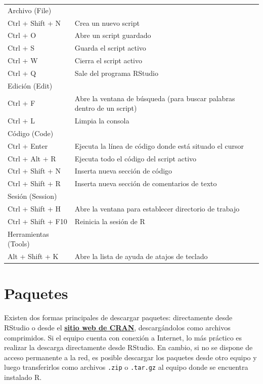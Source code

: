 \documentclass[
  spanish,
  letterpaper,
  DIV=11,
  numbers=noendperiod]{scrreprt}
\begin{document}
\begin{table}
\centering
\begin{tabular}[t]{l|l}
\hline
\cellcolor[HTML]{2f2e4e}{\textcolor{white}{Menú}} & \cellcolor[HTML]{2f2e4e}{\textcolor{white}{Descripción}}\\
\hline
Archivo (File) & \\
\hline
Ctrl + Shift + N & Crea un nuevo script\\
\hline
Ctrl + O & Abre un script guardado\\
\hline
Ctrl + S & Guarda el script activo\\
\hline
Ctrl + W & Cierra el script activo\\
\hline
Ctrl + Q & Sale del programa RStudio\\
\hline
Edición (Edit) & \\
\hline
Ctrl + F & Abre la ventana de búsqueda (para buscar palabras dentro de un script)\\
\hline
Ctrl + L & Limpia la consola\\
\hline
Código (Code) & \\
\hline
Ctrl + Enter & Ejecuta la línea de código donde está situado el cursor\\
\hline
Ctrl + Alt + R & Ejecuta todo el código del script activo\\
\hline
Ctrl + Shift + N & Inserta nueva sección de código\\
\hline
Ctrl + Shift + R & Inserta nueva sección de comentarios de texto\\
\hline
Sesión (Session) & \\
\hline
Ctrl + Shift + H & Abre la ventana para establecer directorio de trabajo\\
\hline
Ctrl + Shift + F10 & Reinicia la sesión de R\\
\hline
Herramientas (Tools) & \\
\hline
Alt + Shift + K & Abre la lista de ayuda de atajos de teclado\\
\hline
\end{tabular}
\end{table}

\section{Paquetes}\label{paquetes}

Existen dos formas principales de descargar paquetes: directamente desde
RStudio o desde el
\href{https://cran.r-project.org/web/packages/}{\textbf{sitio web de
CRAN}}, descargándolos como archivos comprimidos. Si el equipo cuenta
con conexión a Internet, lo más práctico es realizar la descarga
directamente desde RStudio. En cambio, si no se dispone de acceso
permanente a la red, es posible descargar los paquetes desde otro equipo
y luego transferirlos como archivos \texttt{.zip} o \texttt{.tar.gz} al
equipo donde se encuentra instalado R.
\end{document}
